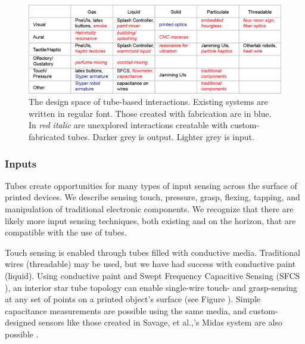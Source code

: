 \begin{figure}[t]
\centering
    \includegraphics[width=\textwidth]{figures/designspace.png}
\caption{The design space of tube-based interactions.  Existing systems are written in regular font.  Those created with fabrication are in {\color{blue}blue}. In \emph{{\color{red}red italic}} are unexplored interactions creatable with custom-fabricated tubes.  Darker grey is output.  Lighter grey is input.  }
\label{fig:designspace}
\end{figure}

\subsubsection{Inputs}

Tubes create opportunities for many types of input sensing across the surface of printed devices.  We describe sensing touch, pressure, grasp, flexing, tapping, and manipulation of traditional electronic components.  We recognize that there are likely more input sensing techniques, both existing and on the horizon, that are compatible with the use of tubes.

Touch sensing is enabled through tubes filled with conductive media.  Traditional wires (threadable) may be used, but we have had success with conductive paint (liquid).  Using conductive paint and Swept Frequency Capacitive Sensing (SFCS \cite{Sato-touche}), an interior star tube topology can enable single-wire touch- and grasp-sensing at any set of points on a printed object's surface (see Figure \cite{fig:toy}).  Simple capacitance measurements are possible using the same media, and custom-designed sensors like those created in Savage, et al.,'s Midas system are also possible \cite{Savage-midas}.

